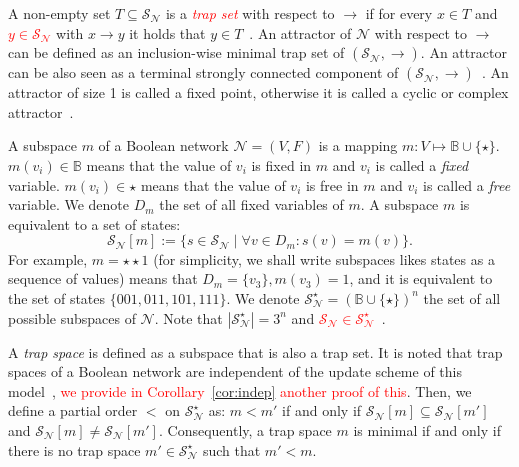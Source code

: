 \documentclass[preprint,12pt]{elsarticle}
\newcommand{\change}[1]{\textcolor{red}{#1}}
\begin{document}
A non-empty set \(T \subseteq \mathcal{S}_{\mathcal{N}}\) is a \change{\emph{trap set}} with respect to \(\rightarrow\) if for every \(x \in T\) and \change{\(y \in \mathcal{S}_{\mathcal{N}}\)} with \(x \rightarrow y\) it holds that \(y \in T\)~\cite{klarner2015computing}.
An attractor of \(\mathcal{N}\) with respect to \(\rightarrow\) can be defined as an inclusion-wise minimal trap set of \((\mathcal{S}_{\mathcal{N}}, \rightarrow)\).
An attractor can be also seen as a terminal strongly connected component of \((\mathcal{S}_{\mathcal{N}}, \rightarrow)\)~\cite{chatain2014characterization}.
An attractor of size 1 is called a fixed point, otherwise it is called a cyclic or complex attractor~\cite{klarner2015computing}.

A subspace \(m\) of a Boolean network \(\mathcal{N} = (V, F)\) is a mapping \(m \colon V \mapsto \mathbb{B} \cup \{\star\}\).
\(m(v_i) \in \mathbb{B}\) means that the value of \(v_i\) is fixed in \(m\) and \(v_i\) is called a \emph{fixed} variable.
\(m(v_i) \in \star\) means that the value of \(v_i\) is free in \(m\) and \(v_i\) is called a \emph{free} variable.
We denote \(D_m\) the set of all fixed variables of \(m\).
A subspace \(m\) is equivalent to a set of states:
\[
\mathcal{S}_{\mathcal{N}}[m] := \{s \in \mathcal{S}_{\mathcal{N}} \mid \forall v \in D_m \colon s(v) = m(v)\}.
\] For example, \(m = \star\star1\) (for simplicity, we shall write subspaces likes states as a sequence of values) means that \(D_m = \{v_3\}, m(v_3) = 1\), and it is equivalent to the set of states \(\{001, 011, 101, 111\}\).
We denote \(\mathcal{S}_{\mathcal{N}}^{\star} = (\mathbb{B} \cup \{\star\})^n\) the set of all possible subspaces of \(\mathcal{N}\).
Note that \(\left\vert\mathcal{S}_{\mathcal{N}}^{\star}\right\vert = 3^n\) and \change{\(\mathcal{S}_{\mathcal{N}} \in \mathcal{S}_{\mathcal{N}}^{\star}\)}~\cite{klarner2015computing}.

A \emph{trap space} is defined as a subspace that is also a trap set.
It is noted that trap spaces of a Boolean network are independent of the update scheme of this model~\cite{klarner2015computing}, \change{we provide in Corollary~\ref{cor:indep} another proof of this}.
Then, we define a partial order \(<\) on \(\mathcal{S}_{\mathcal{N}}^{\star}\) as: \(m < m'\) if and only if \(\mathcal{S}_{\mathcal{N}}[m] \subseteq \mathcal{S}_{\mathcal{N}}[m']\) and \(\mathcal{S}_{\mathcal{N}}[m] \neq \mathcal{S}_{\mathcal{N}}[m']\).
Consequently, a trap space \(m\) is minimal if and only if there is no trap space \(m' \in \mathcal{S}_{\mathcal{N}}^{\star}\) such that \(m' < m\).
\end{document}
